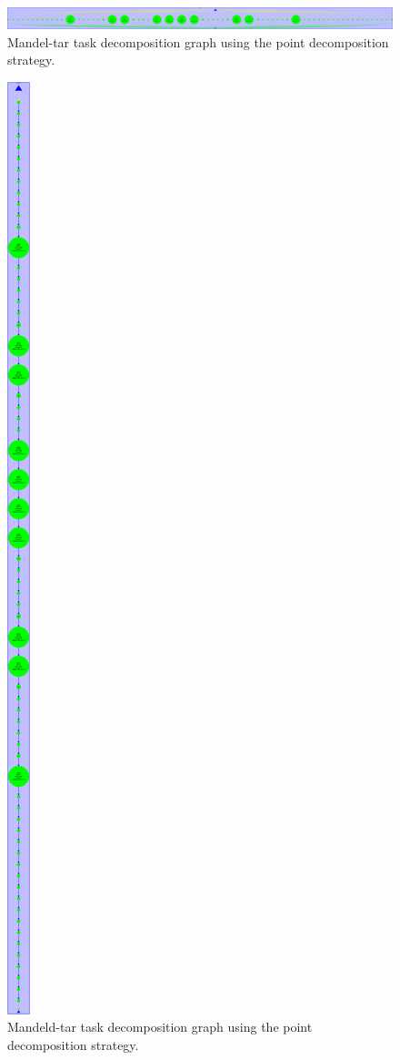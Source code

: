 \documentclass[12pt, a4paper]{article}
\begin{document}
\begin{figure}[H]
	\centering
	\includegraphics[scale=0.106]{./mandel-tar_point}
	\caption{Mandel-tar task decomposition graph using the point decomposition strategy.}
	\label{fig:mandel-tar-point}
\end{figure}

\begin{figure}[H]
	\centering
	\includegraphics[scale=0.106]{./mandeld-tar_point}
	\caption{Mandeld-tar task decomposition graph using the point decomposition strategy.}
	\label{fig:mandeld-tar-point}
\end{figure}
\end{document}
